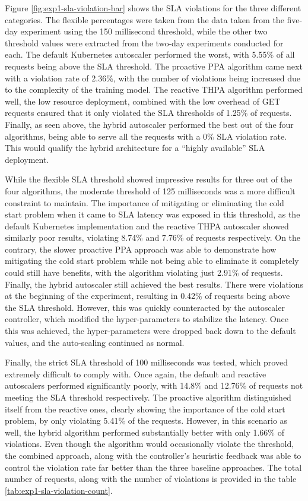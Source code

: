 Figure \ref{fig:exp1-sla-violation-bar} shows the SLA violations for the three different categories. The flexible percentages were taken from the data taken from the five-day experiment using the 150 millisecond threshold, while the other two threshold values were extracted from the two-day experiments conducted for each. The default Kubernetes autoscaler performed the worst, with 5.55\% of all requests being above the SLA threshold. The proactive PPA algorithm came next with a violation rate of 2.36\%, with the number of violations being increased due to the complexity of the training model. The reactive THPA algorithm performed well, the low resource deployment, combined with the low overhead of GET requests ensured that it only violated the SLA thresholds of 1.25\% of requests. Finally, as seen above, the hybrid autoscaler performed the best out of the four algorithms, being able to serve all the requests with a 0\% SLA violation rate. This would qualify the hybrid architecture for a ``highly available'' SLA deployment.\par

While the flexible SLA threshold showed impressive results for three out of the four algorithms, the moderate threshold of 125 milliseconds was a more difficult constraint to maintain. The importance of mitigating or eliminating the cold start problem when it came to SLA latency was exposed in this threshold, as the default Kubernetes implementation and the reactive THPA autoscaler showed similarly poor results, violating 8.74\% and 7.76\% of requests respectively. On the contrary, the slower proactive PPA approach was able to demonstrate how mitigating the cold start problem while not being able to eliminate it completely could still have benefits, with the algorithm violating just 2.91\% of requests. Finally, the hybrid autoscaler still achieved the best results. There were violations at the beginning of the experiment, resulting in 0.42\% of requests being above the SLA threshold. However, this was quickly counteracted by the autoscaler controller, which modified the hyper-parameters to stabilize the latency. Once this was achieved, the hyper-parameters were dropped back down to the default values, and the auto-scaling continued as normal.\par

Finally, the strict SLA threshold of 100 milliseconds was tested, which proved extremely difficult to comply with. Once again, the default and reactive autoscalers performed significantly poorly, with 14.8\% and 12.76\% of requests not meeting the SLA threshold respectively. The proactive algorithm distinguished itself from the reactive ones, clearly showing the importance of the cold start problem, by only violating 5.41\% of the requests. However, in this scenario as well, the hybrid algorithm performed substantially better with only 1.66\% of violations. Even though the algorithm would occasionally violate the threshold, the combined approach, along with the controller's heuristic feedback was able to control the violation rate far better than the three baseline approaches. The total number of requests, along with the number of violations is provided in the table \ref{tab:exp1-sla-violation-count}.\par

